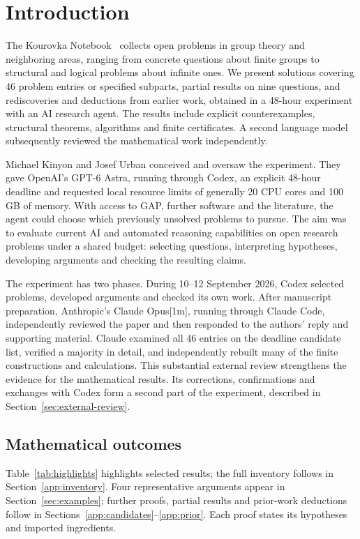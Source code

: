 \section{Introduction}
\label{sec:introduction}

The Kourovka Notebook~\cite{kourovka21} collects open problems in group
theory and neighboring areas, ranging from concrete questions about finite
groups to structural and logical problems about infinite ones. We present
solutions covering 46 problem entries or specified subparts, partial
results on nine questions, and rediscoveries and deductions from earlier
work, obtained in a 48-hour experiment with an AI research agent.
The results include explicit counterexamples, structural theorems,
algorithms and finite certificates. A second language model subsequently
reviewed the mathematical work independently.

Michael Kinyon and Josef Urban conceived and oversaw the experiment.
They gave OpenAI's GPT-6 Astra, running through Codex, an explicit
48-hour deadline and requested local resource limits of generally
20 CPU cores and 100\,GB of memory. With access to GAP, further software
and the literature, the agent could choose which previously unsolved
problems to pursue. The aim was to evaluate current AI and automated
reasoning capabilities on open research problems under a shared budget:
selecting questions, interpreting hypotheses, developing arguments and
checking the resulting claims.

The experiment has two phases. During 10--12 September 2026, Codex
selected problems, developed arguments and checked its own work. After
manuscript preparation, Anthropic's Claude Opus[1m], running through
Claude Code, independently reviewed the paper and then responded to the
authors' reply and supporting material. Claude examined all 46 entries
on the deadline candidate list, verified a majority in detail, and
independently rebuilt many of the finite constructions and calculations.
This substantial external review strengthens the evidence for the
mathematical results. Its corrections, confirmations and exchanges with
Codex form a second part of the experiment, described in
Section~\ref{sec:external-review}.

\subsection{Mathematical outcomes}

Table~\ref{tab:highlights} highlights selected results; the full inventory
follows in Section~\ref{app:inventory}. Four representative arguments
appear in Section~\ref{sec:examples}; further proofs, partial results and
prior-work deductions follow in
Sections~\ref{app:candidates}--\ref{app:prior}. Each proof states its
hypotheses and imported ingredients.

